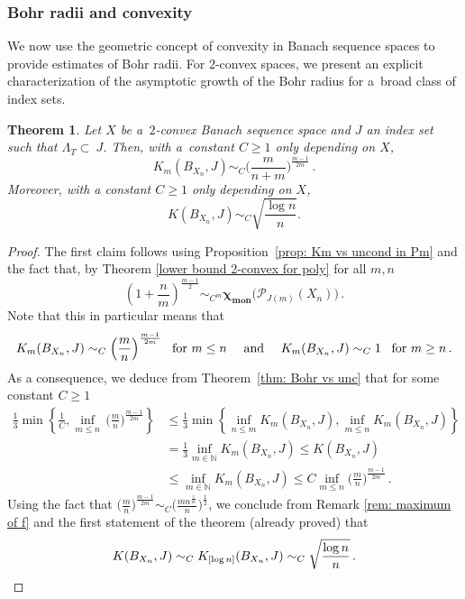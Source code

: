 \documentclass[12pt]{amsart}
\numberwithin{subsection}{section}
\newtheorem{theorem}{Theorem}[section]
\theoremstyle{definition}
\theoremstyle{remark}
\DeclareMathOperator{\mon}{mon}
\newcommand{\chimon}{\chi_{\mon}}
\newcommand{\Pp}{\mathcal{P}}
\begin{document}
\subsubsection{\bf Bohr radii and convexity}

We now use the geometric concept of convexity in Banach sequence spaces to provide estimates of Bohr radii. For $2$-convex spaces,
we present an explicit characterization of the asymptotic growth of the Bohr radius for a~broad class of index sets.

\begin{theorem}\label{thm: 2 convex bohr radiiA}
Let $X$ be a $\,2$-convex Banach sequence space 
and  $J$ an index set such that $\Lambda_{T} \subset~J$.  Then, with a~constant
$C \geq 1$ only depending on $X$,
\[
K_m(B_{X_n},J) \sim_C \Big(\frac{m}{n+m}\Big)^{\frac{m-1}{2m}}\,.
\]
Moreover, with a constant $C \geq 1$ only depending on $X$,
\[
K(B_{X_n},J) \sim_C \sqrt{\frac{\log n}{n}}.
\]
\end{theorem}


\begin{proof}
The first claim follows using  Proposition~\ref{prop: Km vs uncond in Pm} and the fact that, by Theorem
\ref{lower bound 2-convex for poly} for all $m, n$
\[
\left( 1+\frac{n}{m}\right)^{\frac{m-1}{2}}\sim_{C^m} \boldsymbol{\chimon}\big(\Pp_{J(m)}(X_n)\big)\,.
\]
Note that this in particular means that
\[
\text{$K_m(B_{X_n},J) \sim_C \Big(\frac{m}{n}\Big)^{\frac{m-1}{2m}}$ \,  for $m \leq n$ \quad and \quad
$K_m(B_{X_n},J) \sim_C 1$  \, for $m \geq n$\,.}
\]
As a consequence, we deduce from Theorem~\ref{thm: Bohr vs unc}  that for some constant $C \ge 1$
\begin{align*}
\frac{1}{3} \min \left\{ \frac{1}{C} ,\inf_{m \leq n}\,\Big(\frac{m}{n}\Big)^{\frac{m-1}{2m}} \right\}
& \leq \frac{1}{3} \min \left\{  \inf_{n \leq m } K_m(B_{X_n},J),\inf_{m \leq n} K_m(B_{X_n},J) \right\} \\
& = \frac{1}{3} \inf_{ m \in \mathbb{N} } K_m(B_{X_n},J) \le K(B_{X_n},J)\\
& \le \inf_{m \in \mathbb{N}} K_m(B_{X_n},J) \le C \inf_{m \leq n}\Big(\frac{m}{n}\Big)^{\frac{m-1}{2m}}\,.
\end{align*}
Using the fact that $\Big(\frac{m}{n}\Big)^{\frac{m-1}{2m}} \sim_C \Big( \frac{m n^{\frac{1}{m}} }{n}\Big)^{\frac{1}{2}}$,
we conclude from  Remark \ref{rem: maximum of f}  and the first statement of the theorem (already proved) that
\[
K(B_{X_n},J) \sim_C K_{[\log n]}(B_{X_n},J) \sim_C \sqrt{\frac{\log n}{n}}\,. \qedhere
\]
\end{proof}
\end{document}
